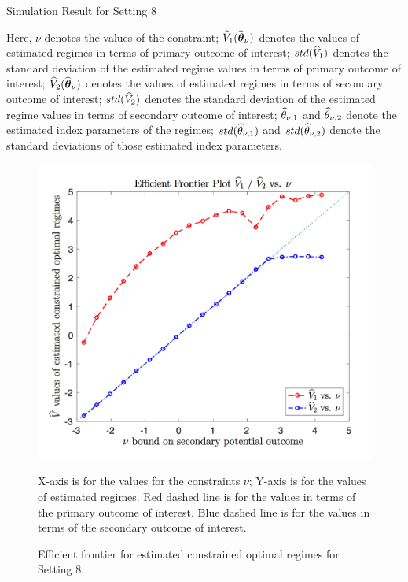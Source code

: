 \begin{table}[!htbp]
	\caption {Simulation Result for Setting 8}
	\centering
	{\tt
		
	}
	\justify
	Here, $\nu$ denotes the values of the constraint; $\widehat{V}_1(\widehat{\boldsymbol{\theta}}_{\nu})$ denotes the values of estimated regimes in terms of primary outcome of interest; $std(\widehat{V}_1)$ denotes the standard deviation of the estimated regime values in terms of primary outcome of interest; $\widehat{V}_2(\widehat{\boldsymbol{\theta}}_{\nu})$ denotes the values of estimated regimes in terms of secondary outcome of interest; $std(\widehat{V}_2)$ denotes the standard deviation of the estimated regime values in terms of secondary outcome of interest; $\widehat{\theta}_{\nu,1}$ and $\widehat{\theta}_{\nu,2}$ denote the estimated index parameters of the regimes; $std(\widehat{\theta}_{\nu,1})$ and $std(\widehat{\theta}_{\nu,2})$ denote the standard deviations of those estimated index parameters.	
\end{table} 
\begin{figure}[!htb]
	\centering
	\includegraphics[width=.9\linewidth]{./Chapter-1/figs/efficient_plot8.png}
	\caption{Efficient frontier for estimated constrained optimal regimes for Setting 8.}
	\label{fig:8}
	\justify
X-axis is for the values for the constraints $\nu$; Y-axis is for the values of estimated regimes. Red dashed line is for the values in terms of the primary outcome of interest. Blue dashed line is for the values in terms of the secondary outcome of interest.
\end{figure}
